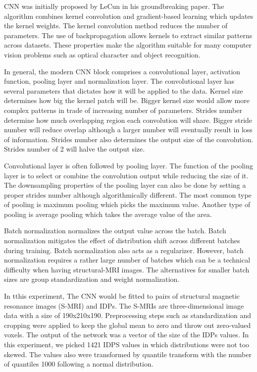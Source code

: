 \documentclass{article}
\begin{document}
    CNN was initially proposed by LeCun\cite{lecun} in his groundbreaking paper. 
    The algorithm combines kernel convolution and gradient-based learning which updates the kernel weights. 
    The kernel convolution method reduces the number of parameters. 
    The use of backpropagation allows kernels to extract similar patterns across datasets. 
    These properties make the algorithm suitable for many computer vision problems such as optical character and object recognition.

    In general, the modern CNN block comprises a convolutional layer, activation function, pooling layer and normalization layer. 
    The convolutional layer has several parameters that dictates how it will be applied to the data. 
    Kernel size determines how big the kernel patch will be. 
    Bigger kernel size would allow more complex patterns in trade of increasing number of parameters. 
    Strides number determine how much overlapping region each convolution will share. 
    Bigger stride number will reduce overlap although a larger number will eventually result in loss of information. 
    Strides number also determines the output size of the convolution. 
    Strides number of 2 will halve the output size.

    Convolutional layer is often followed by pooling layer. 
    The function of the pooling layer is to select or combine the convolution output while reducing the size of it. 
    The downsampling properties of the pooling layer can also be done by setting a proper strides number although algorithmically different. 
    The most common type of pooling is maximum pooling which picks the maximum value. 
    Another type of pooling is average pooling which takes the average value of the area. 

    Batch normalization normalizes the output value across the batch. 
    Batch normalization mitigates the effect of distribution shift across different batches during training. 
    Batch normalization also acts as a regularizer. 
    However, batch normalization requires a rather large number of batches which can be a technical difficulty when having structural-MRI images. 
    The alternatives for smaller batch sizes are group standardization and weight normalization.

    In tthis experiment, The CNN would be fitted to pairs of structural magnetic resonance images (S-MRI) and IDPs. 
    The S-MRIs are three-dimensional image data with a size of 190x210x190. 
    Preprocessing steps such as standardization and cropping were applied to keep the global mean to zero and throw out zero-valued voxels. 
    The output of the network was a vector of the size of the IDPs values. 
    In this experiment, we picked 1421 IDPS values in which distributions were not too skewed. 
    The values also were transformed by quantile transform with the number of quantiles 1000 following a normal distribution. 
\end{document}
